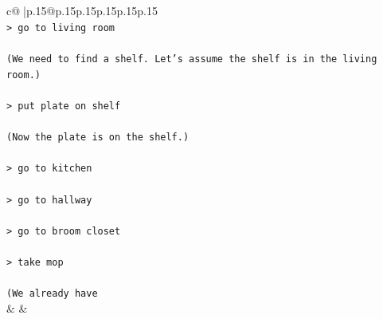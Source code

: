 \documentclass{article}
\begin{document}
{\begin{supertabular}{c@{$\;$}|p{.15\linewidth}@{}p{.15\linewidth}p{.15\linewidth}p{.15\linewidth}p{.15\linewidth}p{.15\linewidth}}
{{{\\ 
\texttt{> go to living room} \\
\\ 
\texttt{(We need to find a shelf. Let's assume the shelf is in the living room.)} \\
\\ 
\texttt{> put plate on shelf} \\
\\ 
\texttt{(Now the plate is on the shelf.)} \\
\\ 
\texttt{> go to kitchen} \\
\\ 
\texttt{> go to hallway} \\
\\ 
\texttt{> go to broom closet} \\
\\ 
\texttt{> take mop} \\
\\ 
\texttt{(We already have} \\
            }
        }
    }
    & & \\ \\


\end{supertabular}}
\end{document}
